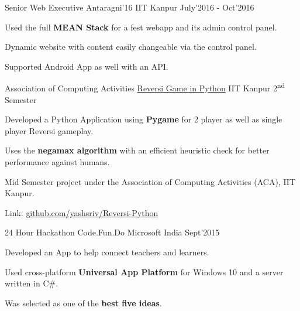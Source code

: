 \begin{cventries}
  \cventry
  {Senior Web Executive}
  {Antaragni'16}
  {IIT Kanpur}
  {July'2016 - Oct'2016}
  {
    \begin{cvitems}
    \item Used the full \textbf{MEAN Stack} for a fest webapp and its admin control panel.
    \item Dynamic website with content easily changeable via the control panel.
    \item Supported Android App as well with an API.
    \end{cvitems}
  }

  \cventry
  {Association of Computing Activities}
  {\href{http://github.com/yashsriv/Reversi-Python}{Reversi Game in Python}}
  {IIT Kanpur}
  {2\textsuperscript{nd} Semester}
  {
    \begin{cvitems}
    \item Developed a Python Application using \textbf{Pygame} for 2 player as well as
      single player Reversi gameplay.
    \item Uses the \textbf{negamax algorithm} with an efficient heuristic check
      for better performance against humans.
    \item Mid Semester project under the Association of Computing Activities (ACA), IIT Kanpur.
    \item Link: \href{https://github.com/yashsriv/Reversi-Python}{github.com/yashsriv/Reversi-Python}
    \end{cvitems}
  }

  \cventry
  {24 Hour Hackathon}
  {Code.Fun.Do}
  {Microsoft India}
  {Sept'2015}
  {
    \begin{cvitems}
    \item Developed an App to help connect teachers and learners.
    \item Used cross-platform \textbf{Universal App Platform} for Windows 10
      and a server written in C\#.
    \item Was selected as one of the \textbf{best five ideas}.
    \end{cvitems}
  }

\end{cventries}

